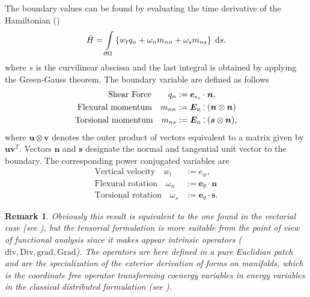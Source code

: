 \documentclass{ifacconf}
\newtheorem{remark}{Remark}
\def\onedot{$\mathsurround0pt\ldotp$}
\def\cddot{%
	\mathbin{\vcenter{\baselineskip.67ex
			\hbox{\onedot}\hbox{\onedot}}%
}}
\begin{document}
The boundary values can be found by evaluating the time derivative of the Hamiltonian  (\cite{BrugnoliMin})
\begin{equation}
\dot{H}= \int_{\partial \Omega} \left\{ w_t q_n  + \omega_n m_{nn} + \omega_s m_{ns} \right\} \d{s}.  
\end{equation}
where $s$ is the curvilinear abscissa and the last integral is obtained by applying the Green-Gauss theorem.
The boundary variable are defined as follows
\begin{equation}
\label{eq:QnMnnMns}
\begin{aligned}
\text{Shear Force} \qquad q_{n} &:=  \bm{e}_{\epsilon_s} \cdot \bm{n},  \\
\text{Flexural momentum} \quad m_{nn} &:=   \bm{E}_{\kappa} \cddot (\bm{n}\otimes{\bm{n}}) 	\\
\text{Torsional momentum} \quad m_{ns} &:=  \bm{E}_{\kappa} \cddot (\bm{s} \otimes{\bm{n}}),	
\end{aligned}
\end{equation}
where $\bm{u} \otimes {\bm{v}}$ denotes the outer product of vectors equivalent to a matrix given by $\bm{u}\bm{v}^T$. Vectors $\bm{n}$ and $\bm{s}$ designate the normal and tangential unit vector to the boundary. The corresponding power conjugated variables are
\begin{equation}
\label{eq:wtwnws}
\begin{aligned}
\text{Vertical velocity}  \quad w_t &:= e_w, \\
\text{Flexural rotation} \quad 
\omega_{n} &:=  \bm{e}_\theta \cdot \bm{n} \\
\text{Torsional rotation} \quad 
\omega_{s} &:=  \bm{e}_\theta \cdot \bm{s}.
\end{aligned}
\end{equation}

\begin{remark}
Obviously this result is equivalent to the one found in the vectorial case (see \cite{MacchelliMindlin}), but the tensorial formulation is more suitable from the point of view of functional analysis since it makes appear intrinsic operators ($\mathrm{div}, \mathrm{Div}, \mathrm{grad}, \mathrm{Grad}$). The operators are here defined in a pure Euclidian patch and are the specialization of the exterior derivation of forms on manifolds, which is	the coordinate free operator transforming coenergy variables in energy variables in the classical distributed formulation (see \cite{Golo}).
\end{remark}
\end{document}
